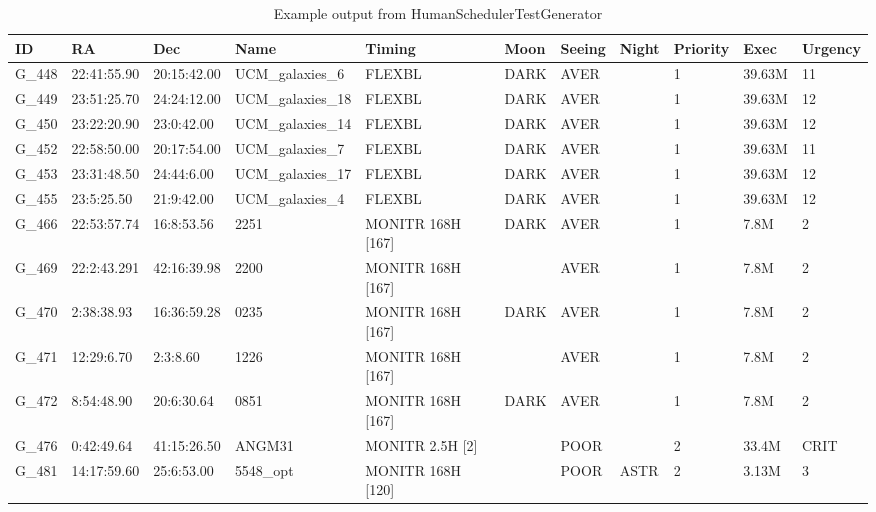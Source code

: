 \begin{landscape}

\begin{table}
\begin{center}
\caption{Example output from HumanSchedulerTestGenerator}
\begin{tabular}{|l|l|l|l|l|l|l|l|l|l|l|}
\hline
{\bf ID} & {\bf RA}    & {\bf Dec} & {\bf Name} & {\bf Timing} & {\bf Moon}  & {\bf Seeing} & {\bf Night}   & {\bf Priority}    & {\bf Exec}   & {\bf Urgency} \\
\hline
G\_448  &22:41:55.90  &20:15:42.00  &UCM\_galaxies\_6&FLEXBL  &DARK &AVER  &       &1 &39.63M  &11 \\
\hline
G\_449  &23:51:25.70  &24:24:12.00  &UCM\_galaxies\_18&FLEXBL &DARK &AVER  &       &1 &39.63M  &12 \\
\hline
G\_450  &23:22:20.90  &23:0:42.00&UCM\_galaxies\_14  &FLEXBL  &DARK &AVER  &       &1 &39.63M  &12 \\
\hline
G\_452  &22:58:50.00  &20:17:54.00  &UCM\_galaxies\_7&FLEXBL  &DARK &AVER  &       &1 &39.63M  &11 \\
\hline
G\_453  &23:31:48.50  &24:44:6.00&UCM\_galaxies\_17  &FLEXBL  &DARK &AVER  &       &1 &39.63M  &12 \\
\hline
G\_455  &23:5:25.50&21:9:42.00&UCM\_galaxies\_4&FLEXBL        &DARK &AVER  &       &1 &39.63M  &12  \\
\hline
G\_466  &22:53:57.74  &16:8:53.56&2251  &MONITR 168H [167]    &DARK &AVER  &       &1 &7.8M   &2  \\
\hline
G\_469  &22:2:43.291  &42:16:39.98  &2200 &MONITR 168H [167]  &     &AVER  &       &1 &7.8M   &2 \\
\hline
G\_470  &2:38:38.93&16:36:59.28  &0235 &MONITR 168H [167]     &DARK &AVER  &       &1 &7.8M   &2  \\
\hline
G\_471  &12:29:6.70&2:3:8.60  &1226 &MONITR 168H [167]        &     &AVER  &       &1 &7.8M   &2  \\
\hline
G\_472  &8:54:48.90&20:6:30.64&0851 &MONITR 168H [167]        &DARK &AVER  &       &1 &7.8M   &2  \\
\hline
G\_476  &0:42:49.64&41:15:26.50  &ANGM31  &MONITR 2.5H [2]    &     &POOR  &       &2 &33.4M   &CRIT  \\
\hline
G\_481  &14:17:59.60  &25:6:53.00&5548\_opt&MONITR 168H [120] &     &POOR  &ASTR   &2 &3.13M  &3  \\
\hline
\end{tabular}
\end{center}
\end{table}

\end{landscape}

